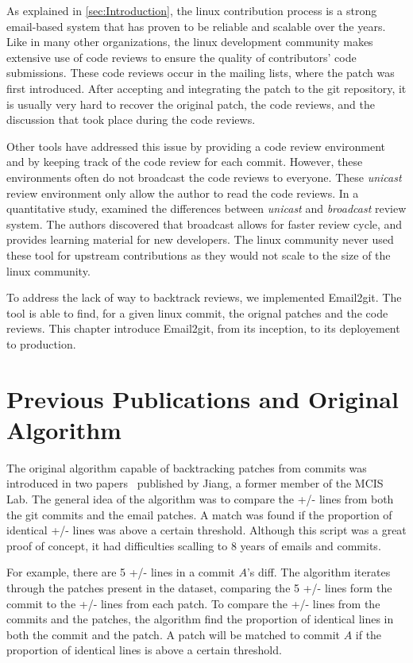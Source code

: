 \label{sec:Theme2}

As explained in \autoref{sec:Introduction}, the linux contribution process is a strong email-based system that has proven to be reliable and scalable over the years. Like in many other organizations, the linux development community makes extensive use of code reviews to ensure the quality of contributors' code submissions. These code reviews occur in the mailing lists, where the patch was first introduced. After accepting and integrating the patch to the git repository, it is usually very hard to recover the original patch, the code reviews, and the discussion that took place during the code reviews. 

Other tools have addressed this issue by providing a code review environment and by keeping track of the code review for each commit. However, these environments often do not broadcast the code reviews to everyone. These \textit{unicast} review environment only allow the author to read the code reviews. In a quantitative study, \citep{armstrong} examined the differences between \textit{unicast} and \textit{broadcast} review system. The authors discovered that broadcast allows for faster review cycle, and provides learning material for new developers. The linux community never used these tool for upstream contributions as they would not scale to the size of the linux community. 


To address the lack of way to backtrack reviews, we implemented Email2git. The tool is able to find, for a given linux commit, the orignal patches and the code reviews. This chapter introduce Email2git, from its inception, to its deployement to production. 

\section{Previous Publications and Original Algorithm}

The original algorithm capable of backtracking patches from commits was introduced in two papers~\citep{msr13jojo,jiang14} published by Jiang, a former member of the MCIS Lab. The general idea of the algorithm was to compare the +/- lines from both the git commits and the email patches. A match was found if the proportion of identical +/- lines was above a certain threshold. Although this script was a great proof of concept, it had difficulties scalling to 8 years of emails and commits. 

For example, there are 5 +/- lines in a commit $A$'s diff. The algorithm iterates through the patches present in the dataset, comparing the 5 +/- lines form the commit to the +/- lines from each patch. To compare the +/- lines from the commits and the patches, the algorithm find the proportion of identical lines in both the commit and the patch. A patch will be matched to commit $A$ if the proportion of identical lines is above a certain threshold. 

